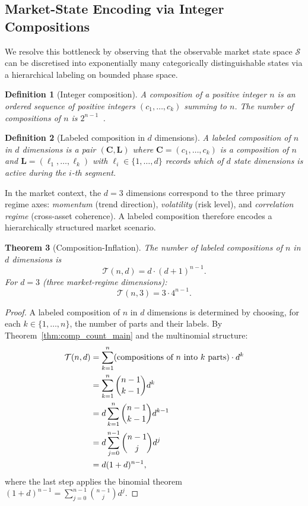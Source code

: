 \documentclass[twocolumn,11pt,a4paper]{article}
\newtheorem{theorem}{Theorem}[section]
\newtheorem{definition}[theorem]{Definition}
\theoremstyle{remark}
\newcommand{\T}{\mathcal{T}}
\begin{document}
\subsection{Market-State Encoding via Integer Compositions}

We resolve this bottleneck by observing that the observable market state space
$\mathcal{S}$ can be discretised into exponentially many categorically distinguishable
states via a hierarchical labeling on bounded phase space.

\begin{definition}[Integer composition]
\label{def:comp}
A \emph{composition} of a positive integer $n$ is an ordered sequence of positive
integers $(c_1,\ldots,c_k)$ summing to $n$. The number of compositions of $n$ is $2^{n-1}$~\cite{andrews1976}.
\end{definition}

\begin{definition}[Labeled composition in $d$ dimensions]
\label{def:labeled}
A \emph{labeled composition} of $n$ in $d$ dimensions is a pair
$(\mathbf{C},\mathbf{L})$ where $\mathbf{C}=(c_1,\ldots,c_k)$ is a composition
of $n$ and $\mathbf{L}=(\ell_1,\ldots,\ell_k)$ with $\ell_i\in\{1,\ldots,d\}$
records which of $d$ state dimensions is active during the $i$-th segment.
\end{definition}

In the market context, the $d=3$ dimensions correspond to the three primary
regime axes: \emph{momentum} (trend direction), \emph{volatility} (risk level),
and \emph{correlation regime} (cross-asset coherence). A labeled composition
therefore encodes a hierarchically structured market scenario.

\begin{theorem}[Composition-Inflation]
\label{thm:compinflation}
The number of labeled compositions of $n$ in $d$ dimensions is
\begin{equation}
  \T(n,d) = d \cdot (d+1)^{n-1}.
  \label{eq:compinflation}
\end{equation}
For $d = 3$ (three market-regime dimensions):
\begin{equation}
  \T(n,3) = 3 \cdot 4^{n-1}.
\end{equation}
\end{theorem}

\begin{proof}
A labeled composition of $n$ in $d$ dimensions is determined by choosing,
for each $k\in\{1,\ldots,n\}$, the number of parts and their labels.
By Theorem~\ref{thm:comp_count_main} and the multinomial structure:
\begin{align}
  \T(n,d)
  &= \sum_{k=1}^n (\text{compositions of } n \text{ into } k \text{ parts})
    \cdot d^k \notag\\
  &= \sum_{k=1}^n \binom{n-1}{k-1} d^k \notag\\
  &= d \sum_{k=1}^n \binom{n-1}{k-1} d^{k-1} \notag\\
  &= d \sum_{j=0}^{n-1} \binom{n-1}{j} d^j \notag\\
  &= d(1+d)^{n-1},
\end{align}
where the last step applies the binomial theorem $(1+d)^{n-1} = \sum_{j=0}^{n-1}\binom{n-1}{j}d^j$.
\end{proof}
\end{document}
